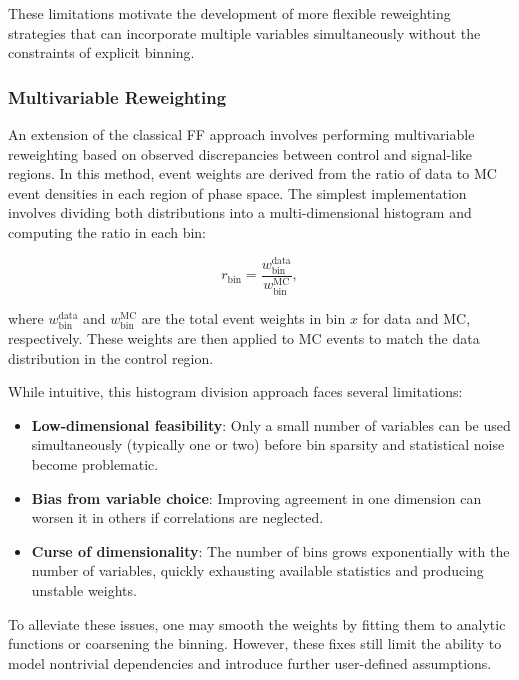 These limitations motivate the development of more flexible reweighting strategies that can incorporate multiple variables simultaneously without the constraints of explicit binning.

\subsubsection{Multivariable Reweighting}
\label{Section:Chapter6_FakeFactors_Reweighting}

An extension of the classical FF approach involves performing multivariable reweighting based on observed discrepancies between control and signal-like regions. In this method, event weights are derived from the ratio of data to MC event densities in each region of phase space. The simplest implementation involves dividing both distributions into a multi-dimensional histogram and computing the ratio in each bin:

\begin{equation}
    r_\text{bin} = \frac{w^\text{data}_\text{bin}}{w^\text{MC}_\text{bin}},
\end{equation}

where $w^\text{data}_\text{bin}$ and $w^\text{MC}_\text{bin}$ are the total event weights in bin $x$ for data and MC, respectively. These weights are then applied to MC events to match the data distribution in the control region.

While intuitive, this histogram division approach faces several limitations:

\begin{itemize}
    \item \textbf{Low-dimensional feasibility}: Only a small number of variables can be used simultaneously (typically one or two) before bin sparsity and statistical noise become problematic.
    \item \textbf{Bias from variable choice}: Improving agreement in one dimension can worsen it in others if correlations are neglected.
    \item \textbf{Curse of dimensionality}: The number of bins grows exponentially with the number of variables, quickly exhausting available statistics and producing unstable weights.
\end{itemize}

To alleviate these issues, one may smooth the weights by fitting them to analytic functions or coarsening the binning. However, these fixes still limit the ability to model nontrivial dependencies and introduce further user-defined assumptions.

